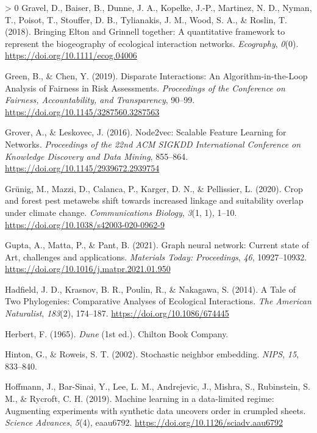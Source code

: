 \documentclass[10pt,oneside]{article}
\newlength{\cslhangindent}
\newenvironment{CSLReferences}[3] %
 {%
  \setlength{\parindent}{0pt}
  \ifodd #1 \everypar{\setlength{\hangindent}{\cslhangindent}}\ignorespaces\fi
  \ifnum #2 > 0
  \setlength{\parskip}{#2\baselineskip}
  \fi
 }%
 {}
\begin{document}
\begin{CSLReferences}{1}{0}
\leavevmode\hypertarget{ref-Gravel2018BriElt}{}%
Gravel, D., Baiser, B., Dunne, J. A., Kopelke, J.-P., Martinez, N. D.,
Nyman, T., Poisot, T., Stouffer, D. B., Tylianakis, J. M., Wood, S. A.,
\& Roslin, T. (2018). Bringing Elton and Grinnell together: A
quantitative framework to represent the biogeography of ecological
interaction networks. \emph{Ecography}, \emph{0}(0).
\url{https://doi.org/10.1111/ecog.04006}

\leavevmode\hypertarget{ref-Green2019DisInt}{}%
Green, B., \& Chen, Y. (2019). Disparate Interactions: An
Algorithm-in-the-Loop Analysis of Fairness in Risk Assessments.
\emph{Proceedings of the Conference on Fairness, Accountability, and
Transparency}, 90--99. \url{https://doi.org/10.1145/3287560.3287563}

\leavevmode\hypertarget{ref-Grover2016NodSca}{}%
Grover, A., \& Leskovec, J. (2016). Node2vec: Scalable Feature Learning
for Networks. \emph{Proceedings of the 22nd ACM SIGKDD International
Conference on Knowledge Discovery and Data Mining}, 855--864.
\url{https://doi.org/10.1145/2939672.2939754}

\leavevmode\hypertarget{ref-Grunig2020CroFor}{}%
Grünig, M., Mazzi, D., Calanca, P., Karger, D. N., \& Pellissier, L.
(2020). Crop and forest pest metawebs shift towards increased linkage
and suitability overlap under climate change. \emph{Communications
Biology}, \emph{3}(1, 1), 1--10.
\url{https://doi.org/10.1038/s42003-020-0962-9}

\leavevmode\hypertarget{ref-Gupta2021GraNeu}{}%
Gupta, A., Matta, P., \& Pant, B. (2021). Graph neural network: Current
state of Art, challenges and applications. \emph{Materials Today:
Proceedings}, \emph{46}, 10927--10932.
\url{https://doi.org/10.1016/j.matpr.2021.01.950}

\leavevmode\hypertarget{ref-Hadfield2014TalTwo}{}%
Hadfield, J. D., Krasnov, B. R., Poulin, R., \& Nakagawa, S. (2014). A
Tale of Two Phylogenies: Comparative Analyses of Ecological
Interactions. \emph{The American Naturalist}, \emph{183}(2), 174--187.
\url{https://doi.org/10.1086/674445}

\leavevmode\hypertarget{ref-Herbert1965Dun}{}%
Herbert, F. (1965). \emph{Dune} (1st ed.). Chilton Book Company.

\leavevmode\hypertarget{ref-Hinton2002StoNei}{}%
Hinton, G., \& Roweis, S. T. (2002). Stochastic neighbor embedding.
\emph{NIPS}, \emph{15}, 833--840.

\leavevmode\hypertarget{ref-Hoffmann2019MacLea}{}%
Hoffmann, J., Bar-Sinai, Y., Lee, L. M., Andrejevic, J., Mishra, S.,
Rubinstein, S. M., \& Rycroft, C. H. (2019). Machine learning in a
data-limited regime: Augmenting experiments with synthetic data uncovers
order in crumpled sheets. \emph{Science Advances}, \emph{5}(4),
eaau6792. \url{https://doi.org/10.1126/sciadv.aau6792}


\end{CSLReferences}
\end{document}
